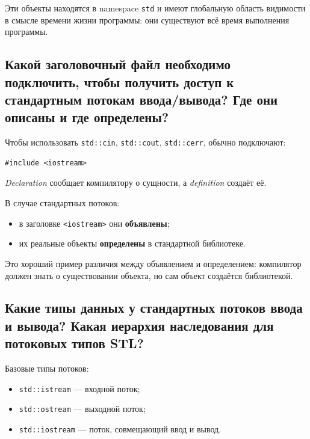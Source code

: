 Эти объекты находятся в namespace \texttt{std} и имеют глобальную область видимости в смысле времени жизни программы: они существуют всё время выполнения программы.

\subsection{Какой заголовочный файл необходимо подключить, чтобы получить доступ к стандартным потокам ввода/вывода? Где они описаны и где определены?}
Чтобы использовать \texttt{std::cin}, \texttt{std::cout}, \texttt{std::cerr}, обычно подключают:
\begin{verbatim}
#include <iostream>
\end{verbatim}

\begin{definition}
\textit{Declaration} сообщает компилятору о сущности, а \textit{definition} создаёт её.
\end{definition}

В случае стандартных потоков:
\begin{itemize}
    \item в заголовке \texttt{<iostream>} они \textbf{объявлены};
    \item их реальные объекты \textbf{определены} в стандартной библиотеке.
\end{itemize}

Это хороший пример различия между объявлением и определением: компилятор должен знать о существовании объекта, но сам объект создаётся библиотекой.

\subsection{Какие типы данных у стандартных потоков ввода и вывода? Какая иерархия наследования для потоковых типов STL?}
Базовые типы потоков:
\begin{itemize}
    \item \texttt{std::istream} — входной поток;
    \item \texttt{std::ostream} — выходной поток;
    \item \texttt{std::iostream} — поток, совмещающий ввод и вывод.
\end{itemize}

